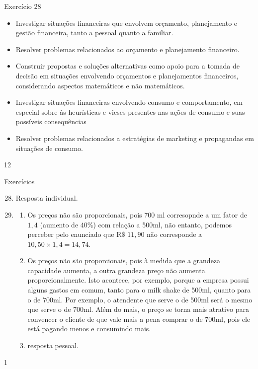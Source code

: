 \begin{objectives}{Exercício 28}
{
  \begin{itemize}
  \item Investigar situações financeiras que envolvem orçamento, planejamento e gestão financeira, tanto a pessoal quanto a familiar.
  \item Resolver problemas relacionados ao orçamento e planejamento financeiro. 
  \item Construir propostas e soluções alternativas como apoio para a tomada de decisão em situações envolvendo orçamentos e planejamentos financeiros, considerando aspectos matemáticos e não matemáticos.
  \end{itemize}


  \begin{itemize}
  \item Investigar situações financeiras envolvendo consumo e comportamento, em especial sobre às heurísticas e vieses presentes nas ações de consumo e suas possíveis consequências
  \item Resolver problemas relacionados a estratégias de marketing e propagandas em situações de consumo.
  \end{itemize}
}{1}{2}
\end{objectives}

\begin{answer}{Exercícios}
{\exerciselist

  \begin{enumerate}\setcounter{enumi}{27}
    \item Resposta individual.
    \item
    \begin{enumerate}
      \item Os preços não são proporcionais, pois 700 ml corresopnde a um fator de $1{,}4$ (aumento de $40$\%) com relação a 500ml, não entanto, podemos perceber pelo enunciado que R\$ $11{,}90$ não corresponde a $10{,}50\times1{,}4=14{,}74$.
      \item Os preços não são proporcionais, pois à medida que a grandeza capacidade aumenta, a outra grandeza preço não aumenta proporcionalmente. Isto acontece, por exemplo, porque a empresa possui alguns gastos em comum, tanto para o milk shake de 500ml, quanto para o de 700ml. Por exemplo, o atendente que serve o de 500ml será o mesmo que serve o de 700ml. Além do mais, o preço se torna mais atrativo para convencer o cliente de que vale mais a pena comprar o de 700ml, pois ele está pagando menos e consumindo mais.
      \item resposta pessoal.
    \end{enumerate}
  \end{enumerate}  
}{1}
\end{answer}
\exercise
\label{fin-exercises}


